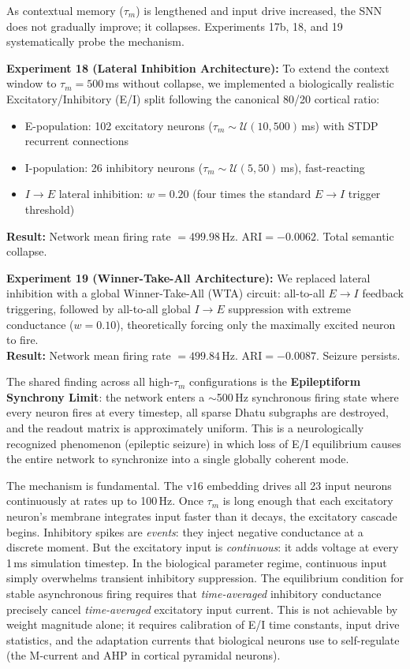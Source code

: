\documentclass[12pt]{article}
\begin{document}
As contextual memory ($\tau_m$) is lengthened and input drive increased, the SNN does not gradually improve; it collapses. Experiments 17b, 18, and 19 systematically probe the mechanism.

\textbf{Experiment 18 (Lateral Inhibition Architecture):} To extend the context window to $\tau_m = 500$\,ms without collapse, we implemented a biologically realistic Excitatory/Inhibitory (E/I) split following the canonical 80/20 cortical ratio:
\begin{itemize}[leftmargin=2em]
  \item E-population: 102 excitatory neurons ($\tau_m \sim \mathcal{U}(10,500)$\,ms) with STDP recurrent connections
  \item I-population: 26 inhibitory neurons ($\tau_m \sim \mathcal{U}(5,50)$\,ms), fast-reacting
  \item $I\to E$ lateral inhibition: $w=0.20$ (four times the standard $E\to I$ trigger threshold)
\end{itemize}
\noindent\textbf{Result:} Network mean firing rate $= 499.98$\,Hz. ARI${}=-0.0062$. Total semantic collapse.

\textbf{Experiment 19 (Winner-Take-All Architecture):} We replaced lateral inhibition with a global Winner-Take-All (WTA) circuit: all-to-all $E\to I$ feedback triggering, followed by all-to-all global $I\to E$ suppression with extreme conductance ($w=0.10$), theoretically forcing only the maximally excited neuron to fire.\\
\noindent\textbf{Result:} Network mean firing rate $= 499.84$\,Hz. ARI${}=-0.0087$. Seizure persists.

The shared finding across all high-$\tau_m$ configurations is the \textbf{Epileptiform Synchrony Limit}: the network enters a $\sim$500\,Hz synchronous firing state where every neuron fires at every timestep, all sparse Dhatu subgraphs are destroyed, and the readout matrix is approximately uniform. This is a neurologically recognized phenomenon (epileptic seizure) in which loss of E/I equilibrium causes the entire network to synchronize into a single globally coherent mode.

The mechanism is fundamental. The v16 embedding drives all 23 input neurons continuously at rates up to 100\,Hz. Once $\tau_m$ is long enough that each excitatory neuron's membrane integrates input faster than it decays, the excitatory cascade begins. Inhibitory spikes are \textit{events}: they inject negative conductance at a discrete moment. But the excitatory input is \textit{continuous}: it adds voltage at every 1\,ms simulation timestep. In the biological parameter regime, continuous input simply overwhelms transient inhibitory suppression. The equilibrium condition for stable asynchronous firing requires that \textit{time-averaged} inhibitory conductance precisely cancel \textit{time-averaged} excitatory input current. This is not achievable by weight magnitude alone; it requires calibration of E/I time constants, input drive statistics, and the adaptation currents that biological neurons use to self-regulate (the M-current and AHP in cortical pyramidal neurons).
\end{document}
